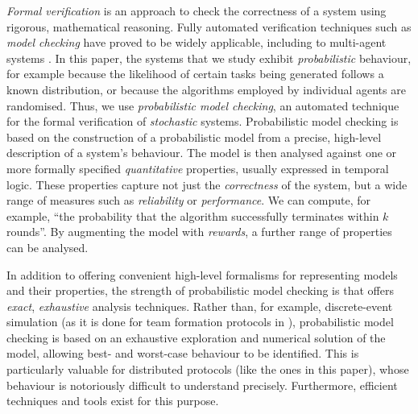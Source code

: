 \documentclass{llncs}
\newcommand{\dave}[1]{\marginpar{\footnotesize \color{red} {\bf D:} \textsf{#1}}}
\begin{document}
\emph{Formal verification} is an approach to check the correctness of a system
using rigorous, mathematical reasoning.
Fully automated verification techniques such as \emph{model checking}
have proved to be widely applicable,
including to multi-agent systems \cite{lomuscio2006mcmas}.
In this paper, the systems that we study exhibit \emph{probabilistic} behaviour,
for example because the likelihood of certain tasks being generated follows a known distribution,
or because the algorithms employed by individual agents are randomised.
Thus, we use \emph{probabilistic model checking}, an automated technique for
the formal verification of \emph{stochastic} systems.
%
%
Probabilistic model checking is based
on the construction of a probabilistic model from a precise,
high-level description of a system's behaviour.
The model is then analysed against one or more formally specified \emph{quantitative} properties,
usually expressed in temporal logic.
These properties capture not just the \emph{correctness} of the system,
but a wide range of measures such as \emph{reliability} or \emph{performance}.
We can compute, for example, ``the probability that the algorithm successfully terminates within $k$ rounds''.
By augmenting the model with \emph{rewards}, a further range of properties can be analysed.

In addition to offering convenient high-level formalisms for representing models and their properties,
the strength of probabilistic model checking is that offers \emph{exact}, \emph{exhaustive} analysis techniques.
Rather than, for example, discrete-event simulation
(as it is done for team formation protocols in \cite{gaston2005agent}),
probabilistic model checking is based on an exhaustive exploration and numerical solution of the model,
allowing best- and worst-case behaviour to be identified.
This is particularly valuable for distributed protocols (like the ones in this paper),
whose behaviour is notoriously difficult to understand precisely. %
Furthermore, efficient techniques and tools exist for this purpose.
\end{document}
